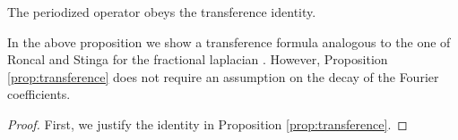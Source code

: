 \begin{proposition}\label{zk-000P}\label{prop:transference}
The periodized operator obeys the transference identity.
\end{proposition}
\begin{remark}\label{zk-000Q}
In the above proposition we show a transference formula analogous to the one of Roncal and Stinga for the fractional laplacian \cite{RoncalStinga}. However, Proposition \ref{prop:transference} does not require an assumption on the decay of the Fourier coefficients.
\end{remark}
\begin{proof}
First, we justify the identity in Proposition \ref{prop:transference}.
\end{proof}

